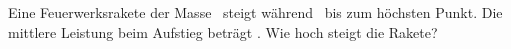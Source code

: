 Eine Feuerwerksrakete der Masse \mrkO\ steigt während \trkO\ bis zum höchsten Punkt. Die mittlere Leistung beim Aufstieg beträgt \PrkO. Wie hoch steigt die Rakete?

